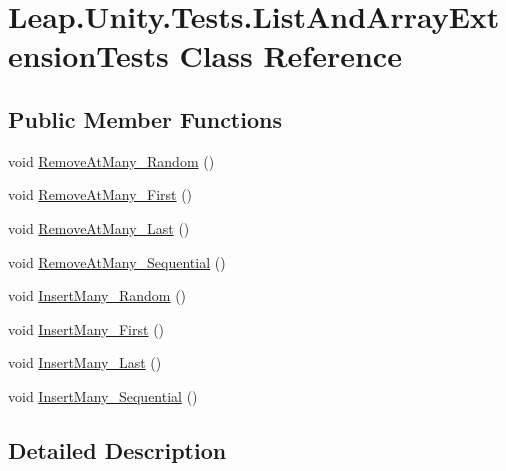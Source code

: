 \hypertarget{class_leap_1_1_unity_1_1_tests_1_1_list_and_array_extension_tests}{}\section{Leap.\+Unity.\+Tests.\+List\+And\+Array\+Extension\+Tests Class Reference}
\label{class_leap_1_1_unity_1_1_tests_1_1_list_and_array_extension_tests}
\subsection*{Public Member Functions}
\begin{DoxyCompactItemize}
\item 
void \mbox{\hyperlink{class_leap_1_1_unity_1_1_tests_1_1_list_and_array_extension_tests_ac0182d00b85b4201d4d3d4529b97a41f}{Remove\+At\+Many\+\_\+\+Random}} ()
\item 
void \mbox{\hyperlink{class_leap_1_1_unity_1_1_tests_1_1_list_and_array_extension_tests_ad4ccdc36696add0acf31b30bd4c5f1cd}{Remove\+At\+Many\+\_\+\+First}} ()
\item 
void \mbox{\hyperlink{class_leap_1_1_unity_1_1_tests_1_1_list_and_array_extension_tests_a778b1a1071d9ed1abd2a85589647dce6}{Remove\+At\+Many\+\_\+\+Last}} ()
\item 
void \mbox{\hyperlink{class_leap_1_1_unity_1_1_tests_1_1_list_and_array_extension_tests_a7fa8e4a81d70bc03a3647009de60832b}{Remove\+At\+Many\+\_\+\+Sequential}} ()
\item 
void \mbox{\hyperlink{class_leap_1_1_unity_1_1_tests_1_1_list_and_array_extension_tests_a37d320a37fb6833f177bda0bc782c86c}{Insert\+Many\+\_\+\+Random}} ()
\item 
void \mbox{\hyperlink{class_leap_1_1_unity_1_1_tests_1_1_list_and_array_extension_tests_ab5a83852fcd4c754ffe8031b12084d1b}{Insert\+Many\+\_\+\+First}} ()
\item 
void \mbox{\hyperlink{class_leap_1_1_unity_1_1_tests_1_1_list_and_array_extension_tests_aec14187ae8f38d24243c9a0d99ff09bd}{Insert\+Many\+\_\+\+Last}} ()
\item 
void \mbox{\hyperlink{class_leap_1_1_unity_1_1_tests_1_1_list_and_array_extension_tests_aa4b052a3570106c72f7fc935b1faa214}{Insert\+Many\+\_\+\+Sequential}} ()
\end{DoxyCompactItemize}


\subsection{Detailed Description}


